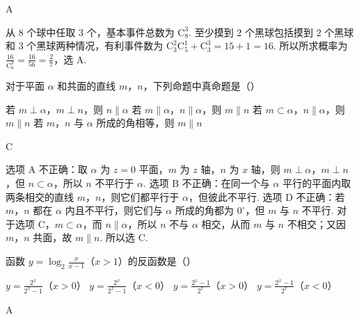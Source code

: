 \begin{answer}
A
\end{answer}

\begin{solution}
从 \(8\) 个球中任取 \(3\) 个，基本事件总数为 \(\mathrm C_8^3\). 至少摸到 \(2\) 个黑球包括摸到 \(2\) 个黑球和 \(3\) 个黑球两种情况，有利事件数为 \(\mathrm C_3^2\mathrm C_5^1+\mathrm C_3^3=15+1=16\). 所以所求概率为 \(\frac{16}{\mathrm C_8^3}=\frac{16}{56}=\frac{2}{7}\)，选 A.
\end{solution}

\begin{problem}
对于平面 \(\alpha\) 和共面的直线 \(m\)，\(n\)，下列命题中真命题是（\quad）

\choices
    {若 \(m \perp \alpha\)，\(m \perp n\)，则 \(n \parallel \alpha\)}
    {若 \(m \parallel \alpha\)，\(n \parallel \alpha\)，则 \(m \parallel n\)}
    {若 \(m \subset \alpha\)，\(n \parallel \alpha\)，则 \(m \parallel n\)}
    {若 \(m\)，\(n\) 与 \(\alpha\) 所成的角相等，则 \(m \parallel n\)}
\end{problem}

\begin{answer}
C
\end{answer}

\begin{solution}
选项 A 不正确：取 \(\alpha\) 为 \(z=0\) 平面，\(m\) 为 \(z\) 轴，\(n\) 为 \(x\) 轴，则 \(m\perp\alpha\)，\(m\perp n\)，但 \(n\subset\alpha\)，所以 \(n\) 不平行于 \(\alpha\). 选项 B 不正确：在同一个与 \(\alpha\) 平行的平面内取两条相交的直线 \(m\)，\(n\)，则它们都平行于 \(\alpha\)，但彼此不平行. 选项 D 不正确：若 \(m\)，\(n\) 都在 \(\alpha\) 内且不平行，则它们与 \(\alpha\) 所成的角都为 \(0^\circ\)，但 \(m\) 与 \(n\) 不平行. 对于选项 C，\(m\subset\alpha\)，而 \(n\parallel\alpha\)，所以 \(n\) 不与 \(\alpha\) 相交，从而 \(m\) 与 \(n\) 不相交；又因 \(m\)，\(n\) 共面，故 \(m\parallel n\). 所以选 C.
\end{solution}

\begin{problem}
函数 \( y = \log_{2} \frac{x}{x - 1} \)（\(x > 1\)）的反函数是（\quad）

\choices
    {\(y = \frac{2^x}{2^x - 1}\)（\(x > 0\)）}
    {\(y = \frac{2^x}{2^x - 1}\)（\(x < 0\)）}
    {\(y = \frac{2^x - 1}{2^x}\)（\(x > 0\)）}
    {\(y = \frac{2^x - 1}{2^x}\)（\(x < 0\)）}
\end{problem}

\begin{answer}
A
\end{answer}


